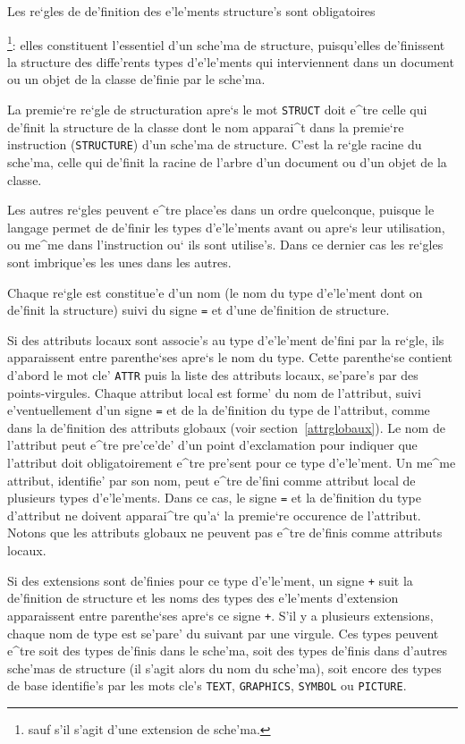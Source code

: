 Les re`gles de de'finition des e'le'ments structure's sont
obligatoires{\footnote {sauf s'il s'agit d'une extension de sche'ma.}: elles
constituent l'essentiel d'un sche'ma de structure, puisqu'elles de'finissent
la structure des diffe'rents types d'e'le'ments qui interviennent dans un
document ou un objet de la classe de'finie par le sche'ma.

La premie`re re`gle de structuration apre`s le mot {\tt STRUCT} doit e^tre
celle qui de'finit la structure de la classe dont le nom apparai^t dans la
premie`re instruction ({\tt STRUCTURE}) d'un sche'ma de structure.
C'est la re`gle racine du sche'ma, celle qui de'finit la racine de l'arbre
d'un document ou d'un objet de la classe.

Les autres re`gles peuvent e^tre place'es dans un ordre quelconque, puisque
le langage permet de de'finir les types d'e'le'ments avant ou apre`s leur
utilisation, ou me^me dans l'instruction ou` ils sont utilise's. Dans ce
dernier cas les re`gles sont imbrique'es les unes dans les autres.

Chaque re`gle est constitue'e d'un nom (le nom du type d'e'le'ment dont
on de'finit la structure) suivi du signe {\tt =} et d'une de'finition de
structure.

Si des attributs locaux sont associe's au type d'e'le'ment de'fini par la re`gle,
ils apparaissent entre parenthe`ses apre`s le nom du type. Cette parenthe`se
contient d'abord le mot cle' {\tt ATTR} puis la liste des attributs locaux,
se'pare's par des points-virgules. Chaque attribut local est forme' du nom de
l'attribut, suivi e'ventuellement d'un signe {\tt =} et de la de'finition
du type de l'attribut, comme dans la de'finition des attributs globaux (voir
section~\ref{attrglobaux}).
Le nom de l'attribut peut e^tre pre'ce'de' d'un point d'exclamation pour
indiquer que l'attribut doit obligatoirement e^tre pre'sent pour ce type
d'e'le'ment.
Un me^me attribut, identifie' par son nom, peut e^tre de'fini comme attribut
local de plusieurs types d'e'le'ments. Dans ce cas, le signe {\tt =} et la
de'finition du type d'attribut ne doivent apparai^tre qu'a` la premie`re
occurence de l'attribut. Notons que les attributs globaux ne peuvent pas e^tre
de'finis comme attributs locaux.

Si des extensions sont de'finies pour ce type d'e'le'ment, un signe {\tt +}
suit la de'finition de structure et les noms des types des e'le'ments
d'extension apparaissent entre parenthe`ses apre`s ce signe {\tt +}. S'il
y a plusieurs extensions, chaque nom de type est se'pare' du suivant
par une virgule. Ces types peuvent e^tre soit des types de'finis dans le
sche'ma, soit des types de'finis dans d'autres sche'mas de structure (il
s'agit alors du nom du sche'ma), soit encore des types de base identifie's
par les mots cle's {\tt TEXT}, {\tt GRAPHICS}, {\tt SYMBOL} ou {\tt PICTURE}.

}
